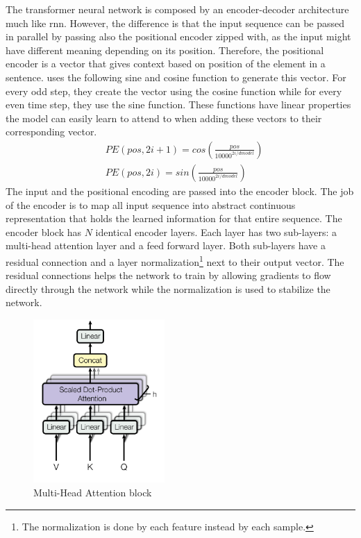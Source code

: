 \documentclass[11pt, a4paper]{article}
\begin{document}
	The transformer neural network is composed by an encoder-decoder architecture  much like \gls{rnn}. However, the difference is that the input sequence can be passed in parallel by passing also the positional encoder zipped with, as the input might have different meaning depending on its position. Therefore, the positional encoder is a vector that gives context based on position of the element in a sentence. \cite{VaswaniSPUJGKP17} uses the following sine and cosine function to generate this vector. For every odd step, they create the vector using the cosine function while for every even time step, they use the sine function. These functions have linear properties the model can easily learn to attend to when adding these vectors to their corresponding vector.
	\begin{align*}
	&PE(pos, 2i + 1) =cos(\frac{pos}{10000^{2i/dmodel}})\\
	&PE(pos, 2i) = sin(\frac{pos}{10000^{2i/dmodel}})
	\end{align*}
	The input and the positional encoding are passed into the encoder block. The job of the encoder is to map all input sequence into abstract continuous representation that holds the learned information for that entire sequence. The encoder block has $N$ identical encoder layers. Each layer has two sub-layers: a multi-head attention layer and a feed forward layer. Both sub-layers have a residual connection and a layer normalization\footnote{The normalization is done by each feature instead by each sample.} next to their output vector. The residual connections helps the network to train by allowing gradients to flow directly through the network while the normalization is used to stabilize the network.
	\begin{figure}[H]
		\centering
		\includegraphics[width=5cm]{imgs/relatedwork/transformer-multihead}
		\caption{Multi-Head Attention block}
		\label{fig:related-transformer-multi-head}
	\end{figure}
\end{document}
